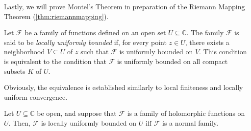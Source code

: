 Lastly, we will prove Montel's Theorem in preparation of the Riemann Mapping Theorem (\cref{thm:riemannmapping}).
\begin{definition}
    Let \(\mathcal{F}\) be a family of functions defined on an open set \(U\subseteq\mathbb{C}\). The family \(\mathcal{F}\) is said to be \textit{locally uniformly bounded} if, for every point \(z\in U\), there exists a neighborhood \(V\subseteq U\) of \(z\) such that \(\mathcal{F}\) is uniformly bounded on \(V\). This condition is equivalent to the condition that \(\mathcal{F}\) is uniformly bounded on all compact subsets \(K\) of \(U\).
\end{definition}
Obviously, the equivalence is established similarly to local finiteness and locally uniform convergence.
\begin{theorem}\label{thm:montel}
    Let \(U\subseteq\mathbb{C}\) be open, and suppose that \(\mathcal{F}\) is a family of holomorphic functions on \(U\). Then, \(\mathcal{F}\) is locally uniformly bounded on \(U\) iff \(\mathcal{F}\) is a normal family.
\end{theorem}
